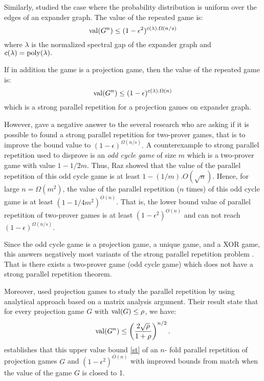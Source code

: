Similarly, \cite{raz2012strong} studied the case where the probability distribution is uniform over the edges of an expander graph. The value of the repeated game is:
$$\mathrm{val} (G^n) \leq (1-\epsilon^2)^{c(\lambda). \Omega(n/s)}$$ where $\lambda$ is the normalized spectral gap of the expander  graph and $c(\lambda)=\operatorname{poly} (\lambda).$ 

If in addition the game is a projection game, then the value of the repeated game is: $$\mathrm{val} (G^n) \leq (1-\epsilon)^{c(\lambda). \Omega(n)}$$ which is  a strong parallel repetition for a projection games on expander graph.

However, \cite{raz2011counterexample} gave a negative answer to the several research who are asking if it is possible to found a strong parallel repetition for two-prover games, that is to improve the bound value to  $(1-\epsilon)^{\Omega(n/s)}.$ A counterexample to strong parallel repetition used to disprove is an \textit{odd cycle game} of size $m$ which is a two-prover game with value $1-1/2m.$ Thus, Raz showed that
the value of the parallel repetition of this odd cycle game is at least $1-(1/m).O(\sqrt{n})$. Hence, for large $n = \Omega(m^2)$, the value of  the parallel repetition ($n$ times) of this odd cycle game is at least $(1-1/4m^2)^{O(n)}$.
That is, the lower bound value of parallel repetition of two-prover games is at least $(1-\epsilon^2)^{O(n)}$ and can not reach $(1-\epsilon)^{\Omega(n/s)}.$

Since the odd cycle game is a projection game, a unique game, and a XOR game, this answers negatively most
variants of the strong parallel repetition problem \citep{raz2011counterexample, raz2012strong}. That is there exists a two-prover game (odd cycle game) which does not have a strong parallel repetition theorem. 

Moreover, \cite{dinur2014analytical} used projection games to study the parallel repetition by using analytical approach based on a matrix analysis argument. Their
result state that for every projection game $G$ with $\mathrm{val} (G) \leq \rho$, we have:  \begin{align}
\mathrm{val} (G^n) \leq \left(\frac{2\sqrt{\rho}}{1+\rho} \right)^{n/2}. \label{st}
\end{align}
\cite{dinur2014analytical} establishes that this upper value  bound \eqref{st} of an $n$- fold parallel repetition of projection games $G$ and  $(1-\epsilon^2)^{O(n)}$  
with improved bounds from  \cite{rao2011parallel} match when the value of the game $G$ is closed to 1.

